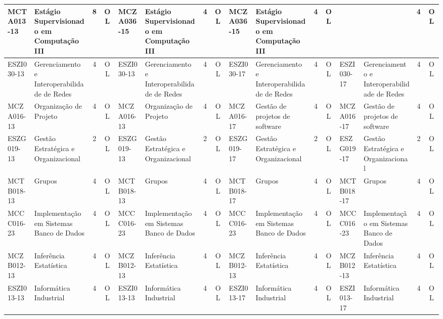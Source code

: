 \documentclass[a4paper]{article}
\begin{document}
\begin{landscape}
{\begin{longtable}{|l|p{.15\textheight}|c|c||l|p{.15\textheight}|c|c||l|p{.15\textheight}|c|c||l|p{.15\textheight}|c|c|}
    MCTA013-13 & Estágio Supervisionado em Computação III & 8 & OL &
    MCZA036-15 & Estágio Supervisionado em Computação III & 4 & OL &
    MCZA036-15 & Estágio Supervisionado em Computação III & 4 & OL &
    &  & 4 & OL \\ \hline

    ESZI030-13 & Gerenciamento e Interoperabilidade de Redes & 4 & OL &
    ESZI030-13 & Gerenciamento e Interoperabilidade de Redes & 4 & OL &
    ESZI030-17 & Gerenciamento e Interoperabilidade de Redes & 4 & OL &
    ESZI030-17 & Gerenciamento e Interoperabilidade de Redes & 4 & OL \\ \hline

    MCZA016-13 & Organização de Projeto & 4 & OL &
    MCZA016-13 & Organização de Projeto & 4 & OL &
    MCZA016-17 & Gestão de projetos de software & 4 & OL & 
    MCZA016-17 & Gestão de projetos de software & 4 & OL \\ \hline

    ESZG019-13 & Gestão Estratégica e Organizacional & 2 & OL &
    ESZG019-13 & Gestão Estratégica e Organizacional & 2 & OL &
    ESZG019-17 & Gestão Estratégica e Organizacional & 2 & OL &
    ESZG019-17 & Gestão Estratégica e Organizacional & 2 & OL \\ \hline

    MCTB018-13 & Grupos & 4 & OL &
    MCTB018-13 & Grupos & 4 & OL &
    MCTB018-17 & Grupos & 4 & OL &
    MCTB018-17 & Grupos & 4 & OL \\ \hline

    MCCC016-23 & Implementação em Sistemas Banco de Dados & 4 & OL &
    MCCC016-23 & Implementação em Sistemas Banco de Dados & 4 & OL &
    MCCC016-23 & Implementação em Sistemas Banco de Dados & 4 & OL &
    MCCC016-23 & Implementação em Sistemas Banco de Dados & 4 & OL \\ \hline

    MCZB012-13 & Inferência Estatística & 4 & OL &
    MCZB012-13 & Inferência Estatística & 4 & OL &
    MCZB012-13 & Inferência Estatística & 4 & OL &
    MCZB012-13 & Inferência Estatística & 4 & OL \\ \hline

    ESZI013-13 & Informática Industrial & 4 & OL &
    ESZI013-13 & Informática Industrial & 4 & OL &
    ESZI013-17 & Informática Industrial & 4 & OL & 
    ESZI013-17 & Informática Industrial & 4 & OL \\ \hline


\end{longtable}}
\end{landscape}
\end{document}
